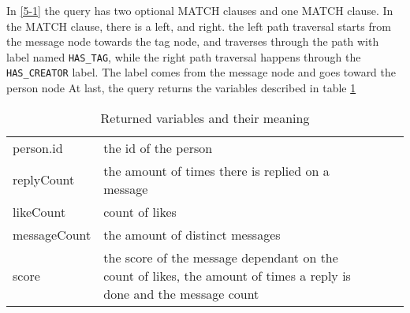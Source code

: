 

In \ref{5-1} the query has two optional MATCH clauses and one MATCH clause.
In the MATCH clause, there is a left, and right.
the left path traversal starts from the message node towards the tag node, and traverses through the path with  label named \texttt{HAS\_TAG}, while the right path traversal happens through the \texttt{HAS\_CREATOR} label. The label comes from the  message node and goes toward the person node
At last, the query returns the  variables described in table \ref{RetCypher5BITable}

\begin{table}[!ht]
\begin{tabular}{|l|l|lll}
\cline{1-2}
person.id    & the id of the person                                                                                                &  &  &  \\ \cline{1-2}
replyCount   & the amount of times there is replied on a message                                                                   &  &  &  \\ \cline{1-2}
likeCount    & count of likes                                                                                                      &  &  &  \\ \cline{1-2}
messageCount & the amount of distinct messages                                                                                     &  &  &  \\ \cline{1-2}
score        & the score of the message dependant on the count of likes, the amount of times a reply is done and the message count &  &  &  \\ \cline{1-2}
\end{tabular}
\caption{Returned variables and their meaning}
\label{RetCypher5BITable}
\end{table}